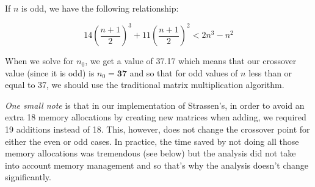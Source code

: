 \documentclass{article}
\begin{document}
	If $n$ is odd, we have the following relationship:
	
	\[14 (\frac{n + 1}{2})^3 + 11 (\frac{n + 1}{2})^2 < 2 n^3 - n^2 \]
	
	\noindent When we solve for $n_0$, we get a value of 37.17 which means that our crossover value (since it is odd) is $n_0 = \boldsymbol{37}$ and so that for odd values of $n$ less than or equal to 37, we should use the traditional matrix multiplication algorithm.  
	
	\medskip
	
	\noindent \emph{One small note} is that in our implementation of Strassen's, in order to avoid an extra 18 memory allocations by creating new matrices when adding, we required 19 additions instead of 18. This, however, does not change the crossover point for either the even or odd cases.  In practice, the time saved by not doing all those memory allocations was tremendous (see below) but the analysis did not take into account memory management and so that's why the analysis doesn't change significantly.
	
	\medskip
	
	\medskip
	
\end{document}
